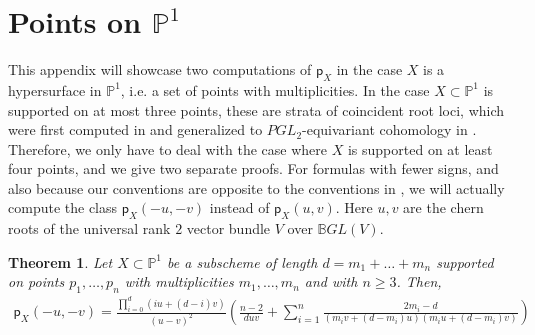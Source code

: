\documentclass[12 pt, reqno]{amsart}
\newtheorem{thm}{Theorem}[section]
\theoremstyle{definition}
\newcommand{\mb}{\mathbb}
\newcommand{\p}{\mathsf{p}}
\begin{document}
\appendix
\section{Points on $\mb{P}^{1}$}
\label{sec:pointsonline}
This appendix will showcase two computations of $\p_X$ in the case $X$
is a hypersurface in $\mathbb{P}^1$, i.e. a set of points with
multiplicities.  In the case $X\subset \mathbb{P}^1$ is supported on
at most three points, these are strata of coincident root loci, which
were first computed in \cite{FNR06} and generalized to
$PGL_2$-equivariant cohomology in \cite{PGL2}. Therefore, we only have
to deal with the case where $X$ is supported on at least four points,
and we give two separate proofs. For formulas with fewer signs, and
also because our conventions are opposite to the conventions in
\cite{FML}, we will actually compute the class $\p_X(-u,-v)$ instead
of $\p_X(u,v)$.  Here $u,v$ are the chern roots of the universal rank
$2$ vector bundle $V$ over $\mathbb{B} GL(V)$.
\begin{thm}
\label{points}
Let $X\subset\mathbb{P}^1$ be a subscheme of length
$d = m_1 + \ldots + m_n$ supported on points $p_1,\ldots,p_n$ with
multiplicities $m_1,\ldots,m_n$ and with $n\geq 3$. Then,
\begin{align*}
  \p_X(-u,-v) = \frac{\prod_{i=0}^{d}{(iu+(d-i)v)}}{(u-v)^2}\left(\frac{n-2}{duv}+\sum_{i=1}^{n}{\frac{2m_i-d}{(m_iv+(d-m_i)u)(m_iu+(d-m_i)v)}}\right)
\end{align*}
\end{thm}
\end{document}
